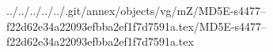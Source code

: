 ../../../../../.git/annex/objects/vg/mZ/MD5E-s4477--f22d62e34a22093efbba2ef1f7d7591a.tex/MD5E-s4477--f22d62e34a22093efbba2ef1f7d7591a.tex